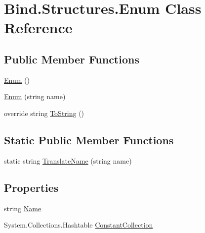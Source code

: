 \hypertarget{class_bind_1_1_structures_1_1_enum}{
\section{Bind.Structures.Enum Class Reference}
\label{class_bind_1_1_structures_1_1_enum}
}
\subsection*{Public Member Functions}
\begin{DoxyCompactItemize}
\item 
\hyperlink{class_bind_1_1_structures_1_1_enum_ae4a5116f3da008d3e4203380bfa6341c}{Enum} ()
\item 
\hyperlink{class_bind_1_1_structures_1_1_enum_ad084432891ef53fb26f406978219105a}{Enum} (string name)
\item 
override string \hyperlink{class_bind_1_1_structures_1_1_enum_a513c7b6ea117c5c6b1c56edb6eec5671}{ToString} ()
\end{DoxyCompactItemize}
\subsection*{Static Public Member Functions}
\begin{DoxyCompactItemize}
\item 
static string \hyperlink{class_bind_1_1_structures_1_1_enum_a625d21d85e7770531eb289a9aa1e382e}{TranslateName} (string name)
\end{DoxyCompactItemize}
\subsection*{Properties}
\begin{DoxyCompactItemize}
\item 
string \hyperlink{class_bind_1_1_structures_1_1_enum_a492ac2beac734b66fbe9aba855b1a9e3}{Name}
\item 
System.Collections.Hashtable \hyperlink{class_bind_1_1_structures_1_1_enum_a88a2bdd5d2b659a5963e4bf9e81c3ef3}{ConstantCollection}
\end{DoxyCompactItemize}


